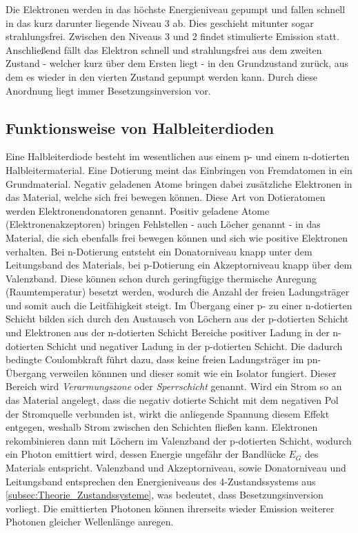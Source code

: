 Die Elektronen werden in das höchste Energieniveau \dq gepumpt\dq{} und fallen schnell in das kurz darunter liegende Niveau 3 ab. Dies geschieht mitunter sogar strahlungsfrei.
Zwischen den Niveaus 3 und 2 findet stimulierte Emission statt. Anschließend fällt das Elektron schnell und strahlungsfrei aus dem zweiten Zustand - welcher kurz über dem Ersten
liegt - in den Grundzustand zurück, aus dem es wieder in den vierten Zustand gepumpt werden kann. Durch diese Anordnung liegt immer Besetzungsinversion vor.

\subsection{Funktionsweise von Halbleiterdioden}
Eine Halbleiterdiode besteht im wesentlichen aus einem p- und einem n-dotierten Halbleitermaterial. Eine \glqq Dotierung\grqq{} meint das Einbringen von Fremdatomen in ein
Grundmaterial. Negativ geladenen Atome bringen dabei zusätzliche Elektronen in das Material, welche sich frei bewegen können. Diese Art von Dotieratomen werden Elektronendonatoren
genannt. Positiv geladene Atome (Elektronenakzeptoren) bringen \dq Fehlstellen\dq{} - auch Löcher genannt - in das Material, die sich ebenfalls frei bewegen können 
und sich wie positive Elektronen verhalten. Bei n-Dotierung entsteht ein Donatorniveau knapp unter dem Leitungsband des Materials, bei p-Dotierung ein Akzeptorniveau knapp 
über dem Valenzband. Diese können schon durch geringfügige thermische Anregung (Raumtemperatur) besetzt werden, wodurch die Anzahl der freien Ladungsträger und somit auch die 
Leitfähigkeit steigt. 
Im Übergang einer p- zu einer n-dotierten Schicht bilden sich durch den Austausch von Löchern aus der p-dotierten Schicht und Elektronen aus der n-dotierten Schicht Bereiche 
positiver Ladung in der n-dotierten Schicht und negativer Ladung in der p-dotierten Schicht. Die dadurch bedingte Coulombkraft führt dazu, dass keine freien Ladungsträger 
im pn-Übergang verweilen könnnen und dieser somit wie ein Isolator fungiert. Dieser Bereich wird \textit{Verarmungszone} oder \textit{Sperrschicht} genannt.
Wird ein Strom so an das Material angelegt, dass die negativ dotierte Schicht mit dem negativen Pol der Stromquelle verbunden ist, wirkt die anliegende Spannung diesem 
Effekt entgegen, weshalb Strom zwischen den Schichten fließen kann. Elektronen rekombinieren dann mit Löchern im Valenzband der p-dotierten Schicht, wodurch ein Photon
emittiert wird, dessen Energie ungefähr der Bandlücke $E_G$ des Materials entspricht. Valenzband und Akzeptorniveau, sowie Donatorniveau und Leitungsband entsprechen 
den Energieniveaus des 4-Zustandssystems aus \autoref{subsec:Theorie_Zustandssysteme}, was bedeutet, dass Besetzungsinversion vorliegt. 
Die emittierten Photonen können ihrerseits wieder Emission weiterer Photonen gleicher Wellenlänge anregen.

